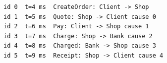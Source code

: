 \begin{lstlisting}[language={},basicstyle=\ttfamily\footnotesize,breaklines=true]
id 0  t=4 ms  CreateOrder: Client -> Shop
id 1  t=5 ms  Quote: Shop -> Client cause 0
id 2  t=6 ms  Pay: Client -> Shop cause 1
id 3  t=7 ms  Charge: Shop -> Bank cause 2
id 4  t=8 ms  Charged: Bank -> Shop cause 3
id 5  t=9 ms  Receipt: Shop -> Client cause 4
\end{lstlisting}

